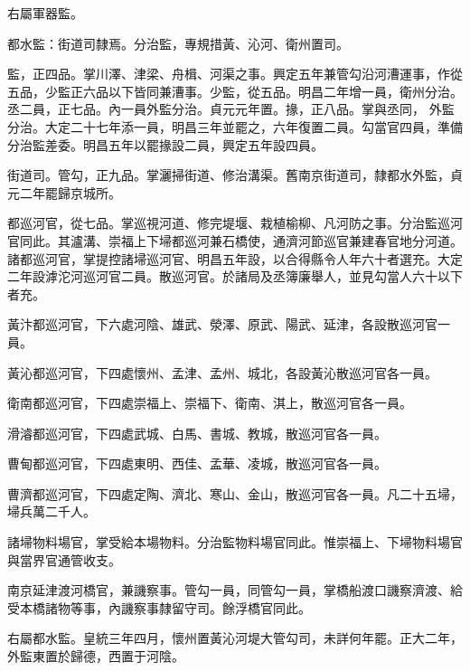 \begin{pinyinscope}
 右屬軍器監。



 都水監：街道司隸焉。分治監，專規措黃、沁河、衛州置司。



 監，正四品。掌川澤、津梁、舟楫、河渠之事。興定五年兼管勾沿河漕運事，作從五品，少監正六品以下皆同兼漕事。少監，從五品。明昌二年增一員，衛州分治。丞二員，正七品。內一員外監分治。貞元元年置。掾，正八品。掌與丞同，
 外監分治。大定二十七年添一員，明昌三年並罷之，六年復置二員。勾當官四員，準備分治監差委。明昌五年以罷掾設二員，興定五年設四員。



 街道司。管勾，正九品。掌灑掃街道、修治溝渠。舊南京街道司，隸都水外監，貞元二年罷歸京城所。



 都巡河官，從七品。掌巡視河道、修完堤堰、栽植榆柳、凡河防之事。分治監巡河官同此。其瀘溝、崇福上下埽都巡河兼石橋使，通濟河節巡官兼建春官地分河道。諸都巡河官，掌提控諸埽巡河官、明昌五年設，以合得縣令人年六十者選充。大定二年設滹沱河巡河官二員。散巡河官。於諸局及丞簿廉舉人，並見勾當人六十以下者充。



 黃汴都巡河官，下六處河陰、雄武、滎澤、原武、陽武、延津，各設散巡河官一員。



 黃沁都巡河官，下四處懷州、孟津、孟州、城北，各設黃沁散巡河官各一員。



 衛南都巡河官，下四處崇福上、崇福下、衛南、淇上，散巡河官各一員。



 滑濬都巡河官，下四處武城、白馬、書城、教城，散巡河官各一員。



 曹甸都巡河官，下四處東明、西佳、孟華、凌城，散巡河官各一員。



 曹濟都巡河官，下四處定陶、濟北、寒山、金山，散巡河官各一員。凡二十五埽，埽兵萬二千人。



 諸埽物料場官，掌受給本場物料。分治監物料場官同此。惟崇福上、下埽物料場官與當界官通管收支。



 南京延津渡河橋官，兼譏察事。管勾一員，同管勾一員，掌橋船渡口譏察濟渡、給受本橋諸物等事，內譏察事隸留守司。餘浮橋官同此。



 右屬都水監。皇統三年四月，懷州置黃沁河堤大管勾司，未詳何年罷。正大二年，外監東置於歸德，西置于河陰。




\end{pinyinscope}
